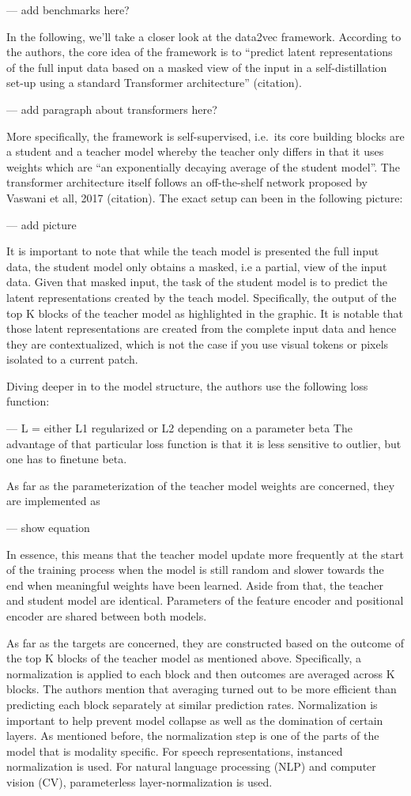 \documentclass[
]{krantz}
\begin{document}
--- add benchmarks here?

In the following, we'll take a closer look at the data2vec framework. According to the authors, the core idea of the framework is to ``predict latent representations of the full input data based on a masked view of the input in a self-distillation set-up using a standard Transformer architecture'' (citation).

--- add paragraph about transformers here?

More specifically, the framework is self-supervised, i.e.~its core building blocks are a student and a teacher model whereby the teacher only differs in that it uses weights which are ``an exponentially decaying average of the student model''. The transformer architecture itself follows an off-the-shelf network proposed by Vaswani et all, 2017 (citation). The exact setup can been in the following picture:

--- add picture

It is important to note that while the teach model is presented the full input data, the student model only obtains a masked, i.e a partial, view of the input data. Given that masked input, the task of the student model is to predict the latent representations created by the teach model. Specifically, the output of the top K blocks of the teacher model as highlighted in the graphic. It is notable that those latent representations are created from the complete input data and hence they are contextualized, which is not the case if you use visual tokens or pixels isolated to a current patch.

Diving deeper in to the model structure, the authors use the following loss function:

--- L = either L1 regularized or L2 depending on a parameter beta
The advantage of that particular loss function is that it is less sensitive to outlier, but one has to finetune beta.

As far as the parameterization of the teacher model weights are concerned,
they are implemented as

--- show equation

In essence, this means that the teacher model update more frequently at the start of the training process when the model is still random and slower towards the end when meaningful weights have been learned. Aside from that, the teacher and student model are identical. Parameters of the feature encoder and positional encoder are shared between both models.

As far as the targets are concerned, they are constructed based on the outcome of the top K blocks of the teacher model as mentioned above. Specifically, a normalization is applied to each block and then outcomes are averaged across K blocks. The authors mention that averaging turned out to be more efficient than predicting each block separately at similar prediction rates. Normalization is important to help prevent model collapse as well as the domination of certain layers. As mentioned before, the normalization step is one of the parts of the model that is modality specific. For speech representations, instanced normalization is used. For natural language processing (NLP) and computer vision (CV), parameterless layer-normalization is used.
\end{document}
